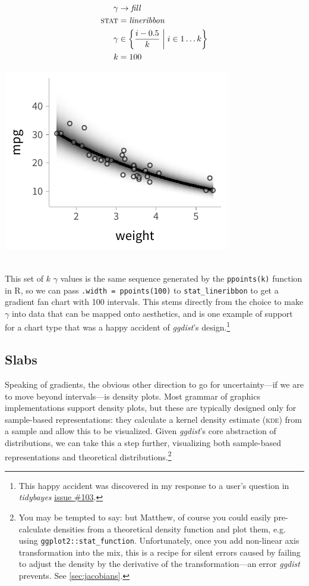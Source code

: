 \documentclass[journal]{vgtc}                     %
\newcommand{\equationfigure}[2]{%
\noindent
\begin{minipage}{.5\columnwidth}
\setlength{\abovedisplayskip}{0pt}
\setlength{\belowdisplayskip}{0pt}
#1\end{minipage}%
\begin{minipage}{.4\columnwidth}\centering #2 \end{minipage}%
\vspace{.5\belowdisplayskip}\\
}
\begin{document}
\equationfigure{
\begin{align*}
\gamma &\rightarrow \mathit{fill}\\
\textsc{stat} &= \mathit{lineribbon}\\
\gamma &\in \left\{\frac{i - 0.5}{k} \mathrel{}\middle|\mathrel{} i \in 1 \dots k \right\}\\
k &= 100
\end{align*}
}{\includegraphics[width=1.2\columnwidth]{figs/3-lineribbon_fan.pdf}}
This set of $k$  $\gamma$ values is the same sequence generated by the \texttt{ppoints(k)} function in R, so we can pass \texttt{.width = ppoints(100)} to \texttt{stat\_lineribbon} to get a gradient fan chart with 100 intervals. This stems directly from the choice to make $\gamma$ into data that can be mapped onto aesthetics, and is one example of support for a chart type that was a happy accident of \textit{ggdist}'s design.\footnote{This happy accident was discovered in my response to a user's question in \textit{tidybayes} \href{https://github.com/mjskay/tidybayes/issues/103}{issue \#103}.}

\subsection{Slabs}

Speaking of gradients, the obvious other direction to go for uncertainty---if we are to move beyond intervals---is density plots. Most grammar of graphics implementations support density plots, but these are typically designed only for sample-based representations: they calculate a kernel density estimate (\textsc{kde}) from a sample and allow this to be visualized. Given \textit{ggdist}'s core abstraction of distributions, we can take this a step further, visualizing both sample-based representations and theoretical distributions.\footnote{\label{foot:jacobians}You may be tempted to say: but Matthew, of course you could easily pre-calculate densities from a theoretical density function and plot them, e.g. using \texttt{ggplot2::stat\_function}. Unfortunately, once you add non-linear axis transformation into the mix, this is a recipe for silent errors caused by failing to adjust the density by the derivative of the transformation---an error \textit{ggdist} prevents. See \cref{sec:jacobians}.} 
\end{document}
